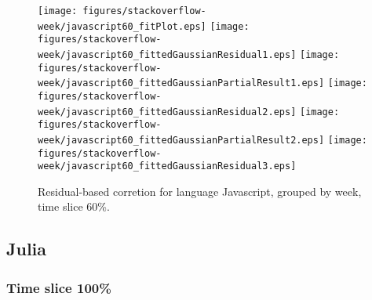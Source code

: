 \begin{figure}[hb]
\centering
{}
{\texttt{[image: figures/stackoverflow-week/javascript60\_fitPlot.eps]}}
{\texttt{[image: figures/stackoverflow-week/javascript60\_fittedGaussianResidual1.eps]}}
{\texttt{[image: figures/stackoverflow-week/javascript60\_fittedGaussianPartialResult1.eps]}}
{\texttt{[image: figures/stackoverflow-week/javascript60\_fittedGaussianResidual2.eps]}}
{\texttt{[image: figures/stackoverflow-week/javascript60\_fittedGaussianPartialResult2.eps]}}
{\texttt{[image: figures/stackoverflow-week/javascript60\_fittedGaussianResidual3.eps]}}
\caption{Residual-based corretion for language Javascript, grouped by week, time slice 60\%.}
\end{figure}


\clearpage 
\newpage 


\subsection{Julia}

\FloatBarrier

\subsubsection{Time slice 100\%}

